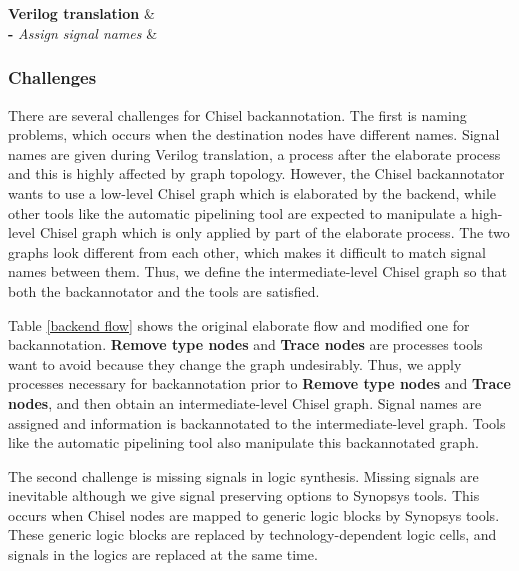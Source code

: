\begin{table*}
\begin{tabular}
		 \\		
		 \\
		\hline
		{\bf Verilog translation} & \\
		{\bf -} \emph{Assign signal names} & \\
		\hline
	\end{tabular}
	\caption{The original backend elaborate flow and the backannotation backend elaborate flow. Note that signal names are assigned to the intermediate-level Chisel graph in the backannotation backend while they are given during Verilog translation in the original backend.}
	\label{backend flow}
\end{table*}

\subsubsection{Challenges} 
\label{challenges}
There are several challenges for Chisel backannotation. The first is naming problems, which occurs when the destination nodes have different names. Signal names are given during Verilog translation, a process after the elaborate process and this is highly affected by graph topology. However, the Chisel backannotator wants to use a low-level Chisel graph which is elaborated by the backend, while other tools like the automatic pipelining tool are expected to manipulate a high-level Chisel graph which is only applied by part of the elaborate process. The two graphs look different from each other, which makes it difficult to match signal names between them. Thus, we define the intermediate-level Chisel graph so that both the backannotator and the tools are satisfied.

Table \ref{backend flow} shows the original elaborate flow and modified one for backannotation. \textbf{Remove type nodes} and \textbf{Trace nodes} are processes tools want to avoid because they change the graph undesirably. Thus, we apply processes necessary for backannotation prior to \textbf{Remove type nodes} and \textbf{Trace nodes}, and then obtain an intermediate-level Chisel graph. Signal names are assigned and information is backannotated to the intermediate-level graph. Tools like the automatic pipelining tool also manipulate this backannotated graph.

The second challenge is missing signals in logic synthesis. Missing signals are inevitable although we give signal preserving options to Synopsys tools. This occurs when Chisel nodes are mapped to generic logic blocks by Synopsys tools. These generic logic blocks are replaced by technology-dependent logic cells, and signals in the logics are replaced at the same time.

